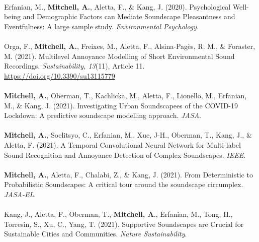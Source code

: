 \documentclass[oneside,fontsize=12pt,titlepage]{scrbook}
\begin{document}
\paragraph*{}
Erfanian, M., \textbf{Mitchell, A.}, Aletta, F., \& Kang, J. (2020). Psychological Well-being and Demographic Factors can Mediate Soundscape Pleasantness and Eventfulness: A large sample study. \emph{Environmental Psychology}.

\paragraph*{}
Orga, F., \textbf{Mitchell, A.}, Freixes, M., Aletta, F., Alsina-Pagès, R. M., \& Foraster, M. (2021). Multilevel Annoyance Modelling of Short Environmental Sound Recordings. \emph{Sustainability, 13}(11), Article 11. \url{https://doi.org/10.3390/su13115779}

\paragraph*{}
\textbf{Mitchell, A.}, Oberman, T., Kachlicka, M., Aletta, F., Lionello, M., Erfanian, M., \& Kang, J. (2021). Investigating Urban Soundscapees of the COVID-19 Lockdown: A predictive soundscape modelling approach. \emph{JASA}.

\paragraph*{}
\textbf{Mitchell, A.}, Soelitsyo, C., Erfanian, M., Xue, J-H., Oberman, T., Kang, J., \& Aletta, F. (2021). A Temporal Convolutional Neural Network for Multi-label Sound Recognition and Annoyance Detection of Complex Soundscapes. \emph{IEEE}.

\paragraph*{}
\textbf{Mitchell, A.}, Aletta, F., Chalabi, Z., \& Kang, J. (2021). From Deterministic to Probabilistic Soundscapes: A critical tour around the soundscape circumplex. \emph{JASA-EL}.

\paragraph*{}
Kang, J., Aletta, F., Oberman, T., \textbf{Mitchell, A}., Erfanian, M., Tong, H., Torresin, S., Xu, C., Yang, T. (2021). Supportive Soundscapes are Crucial for Sustainable Cities and Communities. \emph{Nature Sustainability}.
\end{document}
